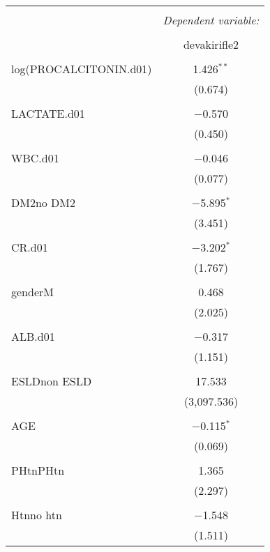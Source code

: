 \documentclass{article}
\begin{document}


\begin{table}[!htbp] \centering 
  \caption{} 
  \label{} 
\begin{tabular}{@{\extracolsep{5pt}}lc} 
\\[-1.8ex]\hline 
\hline \\[-1.8ex] 
 & \multicolumn{1}{c}{\textit{Dependent variable:}} \\ 
\cline{2-2} 
\\[-1.8ex] & devakirifle2 \\ 
\hline \\[-1.8ex] 
 log(PROCALCITONIN.d01) & 1.426$^{**}$ \\ 
  & (0.674) \\ 
  & \\ 
 LACTATE.d01 & $-$0.570 \\ 
  & (0.450) \\ 
  & \\ 
 WBC.d01 & $-$0.046 \\ 
  & (0.077) \\ 
  & \\ 
 DM2no DM2 & $-$5.895$^{*}$ \\ 
  & (3.451) \\ 
  & \\ 
 CR.d01 & $-$3.202$^{*}$ \\ 
  & (1.767) \\ 
  & \\ 
 genderM & 0.468 \\ 
  & (2.025) \\ 
  & \\ 
 ALB.d01 & $-$0.317 \\ 
  & (1.151) \\ 
  & \\ 
 ESLDnon ESLD & 17.533 \\ 
  & (3,097.536) \\ 
  & \\ 
 AGE & $-$0.115$^{*}$ \\ 
  & (0.069) \\ 
  & \\ 
 PHtnPHtn & 1.365 \\ 
  & (2.297) \\ 
  & \\ 
 Htnno htn & $-$1.548 \\ 
  & (1.511) \\ 

\end{tabular}
\end{table}
\end{document}
